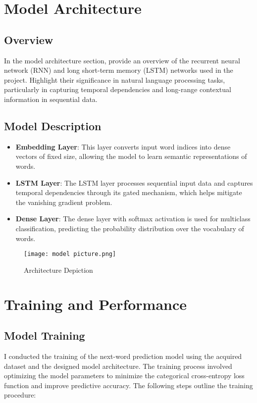 \documentclass[conference]{IEEEtran}
\begin{document}
\section{Model Architecture}
\subsection{Overview}
In the model architecture section, provide an overview of the recurrent neural network (RNN) and long short-term memory (LSTM) networks used in the project. Highlight their significance in natural language processing tasks, particularly in capturing temporal dependencies and long-range contextual information in sequential data. 
\subsection{Model Description}

\begin{itemize}
    \item \textbf{Embedding Layer}: This layer converts input word indices into dense vectors of fixed size, allowing the model to learn semantic representations of words.
    \item \textbf{LSTM Layer}: The LSTM layer processes sequential input data and captures temporal dependencies through its gated mechanism, which helps mitigate the vanishing gradient problem.
    \item \textbf{Dense Layer}: The dense layer with softmax activation is used for multiclass classification, predicting the probability distribution over the vocabulary of words.
\end{itemize}

 \begin{figure}
     \centering
     \texttt{[image: model picture.png]}
     \caption{Architecture Depiction}
     \label{fig:enter-label}
 \end{figure}

\section{Training and Performance}\label{AA}

\subsection{Model Training}

I conducted the training of the next-word prediction model using the acquired dataset and the designed model architecture. The training process involved optimizing the model parameters to minimize the categorical cross-entropy loss function and improve predictive accuracy. The following steps outline the training procedure:
\end{document}
